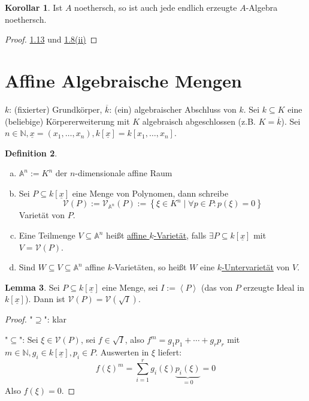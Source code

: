 \documentclass[
twoside=semi,
fontsize=12,
DIV=12, 
cleardoublepage=current,
leqno,
headings=optiontoheadandtoc, 
toc=idx
]{scrbook}
\newcommand{\N}{\mathbb{N}}
\newcommand{\A}{\mathbb{A}}
\newcommand{\V}{\mathcal{V}}
\newcommand{\x}{\underline{x}}
\newcommand{\bracC}[1]{\left< #1 \right>}
\newcommand{\set}[1]{\left\{ #1 \right\}}
\newcommand{\emphasize}[1]{\underline{#1}}
\theoremstyle{definition}
\newtheorem{definition}{Definition}[section]
\newtheorem{lemma}[definition]{Lemma}
\newtheorem{korollar}[definition]{Korollar}
\begin{document}
	\begin{korollar}\label{1.1.14}\hfill\newline
		Ist $A$ noethersch, so ist auch jede endlich erzeugte $A$-Algebra noethersch.
	\end{korollar}
	
	\begin{proof}
		\hyperref[1.1.13]{1.13} und \hyperref[1.1.8.2]{1.8(ii)}
	\end{proof}

	\newpage
	\section{Affine Algebraische Mengen}\thispagestyle{sectionstart}
	$k$: (fixierter) Grundk\"orper, $\overline{k}$: (ein) algebraischer Abschluss von $k$. Sei $k \subseteq K$ eine (beliebige) K\"orpererweiterung mit $K$ algebraisch abgeschlossen (z.B. $K=\overline{k}$). \newline
	Sei $n \in \N, \x = (x_1, \dots, x_n), k[\x] = k[x_1, \dots, x_n]$.
	
	\begin{definition}\label{1.2.1}\hfill
		\begin{enumerate}[(a)]
			\item $\A^n := K^n$ der $n$-dimensionale affine Raum
			
			\item Sei $P \subseteq k[\x]$ eine Menge von Polynomen, dann schreibe 	
				\[\V(P) := \V_{\A^n}(P) := \set{\xi \in K^n \mid \forall p \in P: p(\xi) = 0}\]
			Variet\"at von $P$.
			\item Eine Teilmenge $V \subseteq \A^n$ hei\ss t \emphasize{affine $k$-Variet\"at}, falls $\exists P \subseteq k[\x]$ mit $V = \V(P)$.
			
			\item Sind $W \subseteq V \subseteq \A^n$ affine $k$-Variet\"aten, so hei\ss t $W$ eine \emphasize{$k$-Untervariet\"at} von $V$. 
		\end{enumerate}
	\end{definition}

	\begin{lemma}\label{1.2.2}\hfill\newline
		Sei $P \subseteq k[\x]$ eine Menge, sei $I:= \bracC{P}$ (das von $P$ erzeugte Ideal in $k[\x]$). Dann ist 
		$\V(P) = \V(\sqrt{I})$.
	\end{lemma}

	\begin{proof}\hfill\newline
		"$\supseteq$": klar
		
		\medskip\noindent
		"$\subseteq$": Sei $\xi \in \V(P)$, sei $f \in \sqrt{I}$, also $f^m = g_1p_1 + \cdots +g_rp_r$ mit $m \in \N, g_i \in k[\x], p_i \in P$. Auswerten in $\xi$ liefert:
			\[f(\xi)^m = \sum_{i=1}^r g_i(\xi)\underbrace{p_i(\xi)}_{=0} = 0\]
		Also $f(\xi) = 0$.
	\end{proof}
\end{document}
